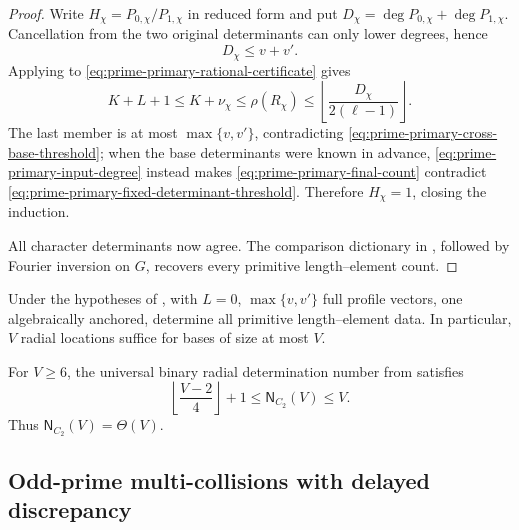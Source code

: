 \begin{proof}
Write \(H_\chi=P_{0,\chi}/P_{1,\chi}\) in reduced form and put
\(D_\chi=\deg P_{0,\chi}+\deg P_{1,\chi}\).  Cancellation from the two
original determinants can only lower degrees, hence
\begin{equation}\label{eq:prime-primary-input-degree}
 D_\chi\le v+v'.
\end{equation}
Applying  to
\eqref{eq:prime-primary-rational-certificate} gives
\begin{equation}\label{eq:prime-primary-final-count}
 K+L+1\le K+\nu_\chi
 \le\rho(R_\chi)
 \le\left\lfloor\frac{D_\chi}{2(\ell-1)}\right\rfloor.
\end{equation}
The last member is at most \(\max\{v,v'\}\), contradicting
\eqref{eq:prime-primary-cross-base-threshold}; when the base determinants were
known in advance, \eqref{eq:prime-primary-input-degree} instead makes
\eqref{eq:prime-primary-final-count} contradict
\eqref{eq:prime-primary-fixed-determinant-threshold}.  Therefore
\(H_\chi=1\), closing the induction.

All character determinants now agree.  The comparison dictionary in
, followed by Fourier inversion on \(G\),
recovers every primitive length--element count.
\end{proof}

\begin{corollary}
\label{cor:prime-primary-linear-radial-determination}
Under the hypotheses of ,
with \(L=0\),
\(\max\{v,v'\}\) full profile vectors, one algebraically anchored, determine
all primitive length--element data.  In particular, \(V\) radial locations
suffice for bases of size at most \(V\).
\end{corollary}

\begin{corollary}
\label{cor:exact-binary-radial-sampling-order}
For \(V\ge6\),
the universal binary radial determination number from
 satisfies
\begin{equation}\label{eq:exact-binary-radial-sampling-order}
 \left\lfloor\frac{V-2}{4}\right\rfloor+1
 \le\mathsf N_{C_2}(V)\le V.
\end{equation}
Thus \(\mathsf N_{C_2}(V)=\Theta(V)\).
\end{corollary}

\subsection{Odd-prime multi-collisions with delayed discrepancy}
\label{sec:odd-prime-delayed-multicollisions}

